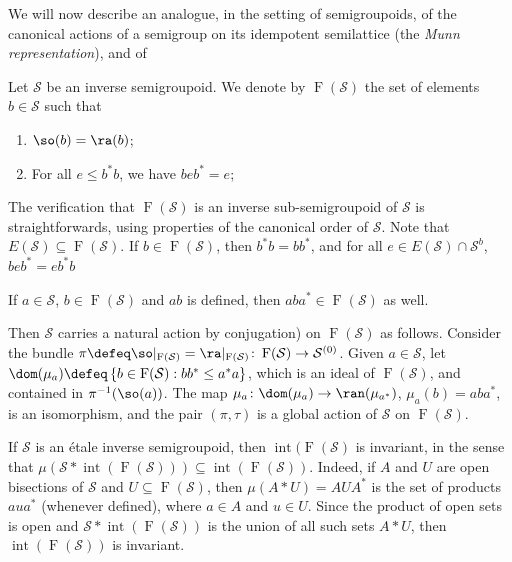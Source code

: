 \begin{example}\label{ex:munn}
    We will now describe an analogue, in the setting of semigroupoids, of the canonical actions of a semigroup on its idempotent semilattice (the \emph{Munn representation}), and of 
    
    Let $\mathcal{S}$ be an inverse semigroupoid. We denote by $\operatorname{F}(\mathcal{S})$ the set of elements $b\in\mathcal{S}$ such that
    \begin{enumerate}[label=(\roman*)]
        \item $\so(b)=\ra(b)$;
        \item For all $e\leq b^*b$, we have $beb^*=e$;
    \end{enumerate}
    
    The verification that $\operatorname{F}(\mathcal{S})$ is an inverse sub-semigroupoid of $\mathcal{S}$ is straightforwards, using properties of the canonical order of $\mathcal{S}$. Note that $E(\mathcal{S})\subseteq\operatorname{F}(\mathcal{S})$. If $b\in\operatorname{F}(\mathcal{S})$, then $b^*b=bb^*$, and for all $e\in E(\mathcal{S})\cap\mathcal{S}^b$, $beb^*=eb^*b$
    
    If $a\in\mathcal{S}$, $b\in\operatorname{F}(\mathcal{S})$ and $ab$ is defined, then $aba^*\in\operatorname{F}(\mathcal{S})$ as well.
    
    Then $\mathcal{S}$ carries a natural action by conjugation) on $\operatorname{F}(\mathcal{S})$ as follows. Consider the bundle $\pi\defeq\so|_{\operatorname{F}(\mathcal{S})}=\ra|_{\operatorname{F}(\mathcal{S})}\colon\operatorname{F}(\mathcal{S})\to\mathcal{S}^{(0)}$. Given $a\in\mathcal{S}$, let $\dom(\mu_a)\defeq\left\{b\in\operatorname{F}(\mathcal{S}):bb^*\leq a^*a\right\}$, which is an ideal of $\operatorname{F}(\mathcal{S})$, and contained in $\pi^{-1}(\so(a))$. The map $\mu_a\colon\dom(\mu_a)\to\ran(\mu_{a^*})$, $\mu_a(b)=aba^*$, is an isomorphism, and the pair $(\pi,\tau)$ is a global action of $\mathcal{S}$ on $\operatorname{F}(\mathcal{S})$.
    
    If $\mathcal{S}$ is an étale inverse semigroupoid, then $\operatorname{int}(\operatorname{F}(\mathcal{S})$ is invariant, in the sense that $\mu(\mathcal{S}\ast\operatorname{int}(\operatorname{F}(\mathcal{S})))\subseteq \operatorname{int}(\operatorname{F}(\mathcal{S}))$. Indeed, if $A$ and $U$ are open bisections of $\mathcal{S}$ and $U\subseteq\operatorname{F}(\mathcal{S})$, then $\mu(A\ast U)=AUA^*$ is the set of products $aua^*$ (whenever defined), where $a\in A$ and $u\in U$. Since the product of open sets is open and $\mathcal{S}\ast\operatorname{int}(\operatorname{F}(\mathcal{S}))$ is the union of all such sets $A\ast U$, then $\operatorname{int}(\operatorname{F}(\mathcal{S}))$ is invariant.
    

\end{example}
